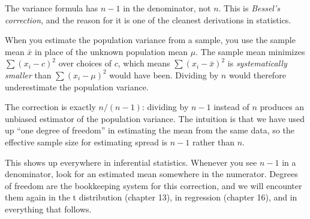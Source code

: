 \documentclass[
  letterpaper,
  11pt,
  twoside,
  openany]{scrbook}
\begin{document}
\begin{tcolorbox}[enhanced jigsaw, arc=.35mm, bottomrule=.15mm, bottomtitle=1mm, breakable, colback=white, colbacktitle=quarto-callout-note-color!10!white, colframe=quarto-callout-note-color-frame, coltitle=black, left=2mm, leftrule=.75mm, opacityback=0, opacitybacktitle=0.6, rightrule=.15mm, title=\textcolor{quarto-callout-note-color}{\faInfo}\hspace{0.5em}{Inside the math: where the n-1 comes from}, titlerule=0mm, toprule=.15mm, toptitle=1mm]

The variance formula has \(n-1\) in the denominator, not \(n\). This is
\emph{Bessel's correction}, and the reason for it is one of the cleanest
derivations in statistics.

When you estimate the population variance from a sample, you use the
sample mean \(\bar{x}\) in place of the unknown population mean \(\mu\).
The sample mean minimizes \(\sum(x_i - c)^2\) over choices of \(c\),
which means \(\sum(x_i - \bar{x})^2\) is \emph{systematically smaller}
than \(\sum(x_i - \mu)^2\) would have been. Dividing by \(n\) would
therefore underestimate the population variance.

The correction is exactly \(n/(n-1)\): dividing by \(n-1\) instead of
\(n\) produces an unbiased estimator of the population variance. The
intuition is that we have used up ``one degree of freedom'' in
estimating the mean from the same data, so the effective sample size for
estimating spread is \(n-1\) rather than \(n\).

This shows up everywhere in inferential statistics. Whenever you see
\(n-1\) in a denominator, look for an estimated mean somewhere in the
numerator. Degrees of freedom are the bookkeeping system for this
correction, and we will encounter them again in the t distribution
(chapter 13), in regression (chapter 16), and in everything that
follows.

\end{tcolorbox}
\end{document}
